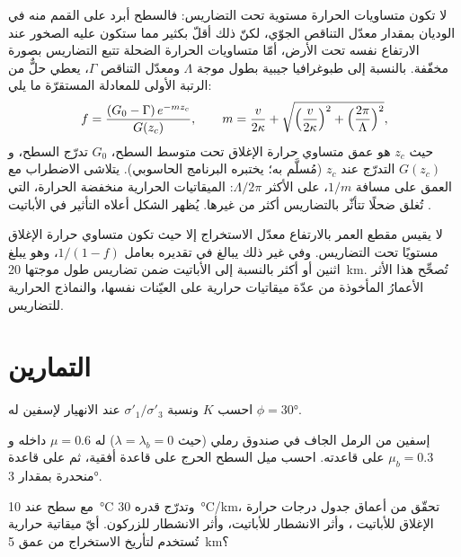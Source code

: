 لا تكون متساويات الحرارة مستوية تحت التضاريس: فالسطح أبرد على القمم
منه في الوديان بمقدار معدّل التناقص الجوّي، لكنّ ذلك أقلّ بكثير مما
ستكون عليه الصخور عند الارتفاع نفسه تحت الأرض، أمّا متساويات الحرارة الضحلة
تتبع التضاريس بصورة مخفّفة. بالنسبة إلى طبوغرافيا جيبية بطول موجة
$\Lambda$ ومعدّل التناقص $\Gamma$، يعطي حلٌّ من الرتبة الأولى للمعادلة
المستقرّة ما يلي:
\[
  f = \frac{(G_0 - \Gamma)\,e^{-mz_c}}{G(z_c)},\qquad
  m = \frac{v}{2\kappa} + \sqrt{\Bigl(\frac{v}{2\kappa}\Bigr)^2 +
  \Bigl(\frac{2\pi}{\Lambda}\Bigr)^2},
\]
حيث $z_c$ هو عمق متساوي حرارة الإغلاق تحت متوسط السطح،
$G_0$ تدرّج السطح، و$G(z_c)$ التدرّج عند $z_c$ (مُسلَّم به؛
يختبره البرنامج الحاسوبي). يتلاشى الاضطراب مع العمق على
مسافة $1/m$، على الأكثر $\Lambda/2\pi$: الميقاتيات الحرارية منخفضة الحرارة،
التي تُغلق ضحلًا تتأثّر بالتضاريس أكثر من غيرها. يُظهر الشكل أعلاه التأثير
في الأباتيت .

لا يقيس مقطع العمر بالارتفاع معدّل الاستخراج إلا حيث تكون
متساوي حرارة الإغلاق مستويًا تحت التضاريس. وفي غير ذلك يبالغ في تقديره بعامل $1/(1 - f)$، وهو يبلغ
اثنين أو أكثر بالنسبة إلى الأباتيت  ضمن تضاريس طول موجتها \qty{20}{km}.
تُصحِّح هذا الأثر الأعمارُ المأخوذة من عدّة ميقاتيات حرارية على العيّنات نفسها، والنماذج الحرارية
للتضاريس.

\section{التمارين}

\begin{exercise}[$\star$]\label{exo:b3:orogenic-wedges:1}
احسب $K$ ونسبة $\sigma'_1/\sigma'_3$ عند الانهيار لإسفين
له $\phi = \ang{30}$.
\end{exercise}

\begin{exercise}[$\star$]\label{exo:b3:orogenic-wedges:2}
إسفين من الرمل الجاف في صندوق رملي (حيث $\lambda = \lambda_b = 0$) له $\mu = 0.6$
داخله و$\mu_b = 0.3$ على قاعدته. احسب ميل السطح الحرج على قاعدة
أفقية، ثم على قاعدة منحدرة بمقدار \ang{3}.
\end{exercise}

\begin{exercise}[$\star$]\label{exo:b3:orogenic-wedges:3}
مع سطح عند \qty{10}{\celsius} وتدرّج قدره \qty{30}{\celsius/km}،
تحقّق من أعماق جدول درجات حرارة الإغلاق للأباتيت
، وأثر الانشطار للأباتيت، وأثر الانشطار للزركون. أيّ
ميقاتية حرارية تُستخدم لتأريخ الاستخراج من عمق \qty{5}{km}؟
\end{exercise}

